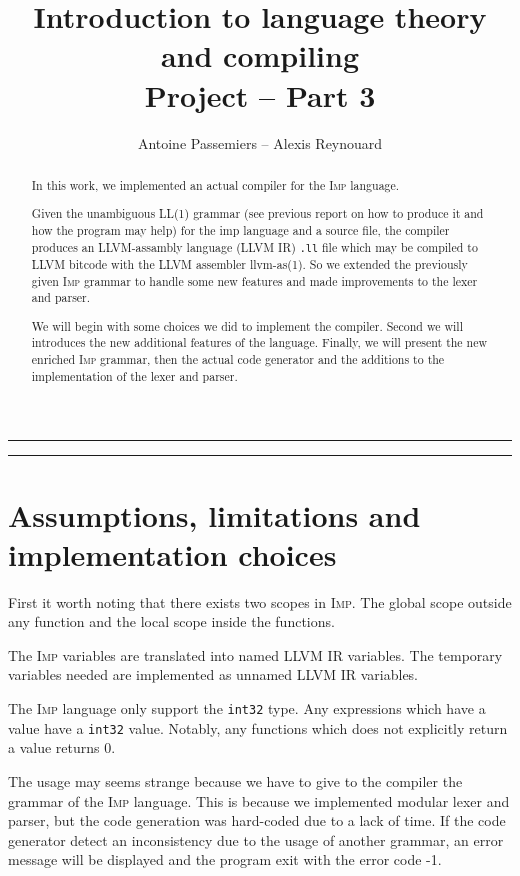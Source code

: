 \documentclass[11pt]{article}
\title{Introduction to language theory and compiling \\ Project -- Part 3}
\author{Antoine Passemiers -- Alexis Reynouard}
\newcommand\imp{\textsc{Imp}\xspace}
\newcommand\inttt{\texttt{int32}\xspace}
\begin{document}
\maketitle
\thispagestyle{empty}

\vfil
\begin{abstract}
In this work, we implemented an actual compiler for the \imp language.

Given the unambiguous LL(1) grammar (see previous report on how to produce it and how the program may help) for the imp
language and a source file, the compiler produces an LLVM-assambly language (LLVM IR) \texttt{.ll} file which may be
compiled to LLVM bitcode with the LLVM assembler \textsf{llvm-as(1)}.
So we extended the previously given \imp grammar to handle some new features
and made improvements to the lexer and parser.

We will begin with some choices we did to implement the compiler.
Second we will introduces the new additional features of the language.
Finally, we will present the new enriched \imp grammar,
then the actual code generator and the additions to the implementation of the lexer and parser.
\end{abstract}

\clearpage
\vfill
\hrule
\vspace{\baselineskip}
\tableofcontents
\vspace{3\baselineskip}
\hrule
\vfill
\clearpage

\setcounter{page}{1}

\section{Assumptions, limitations and implementation choices}

First it worth noting that there exists two scopes in \imp.
The global scope outside any function and the local scope inside the functions.

The \imp variables are translated into named LLVM IR variables.
The temporary variables needed are implemented as unnamed LLVM IR variables.

The \imp language only support the \inttt type.
Any expressions which have a value have a \inttt value.
Notably, any functions which does not explicitly return a value returns 0.

The usage may seems strange because we have to give to the compiler the grammar of the \imp language.
This is because we implemented modular lexer and parser, but the code generation was hard-coded due to a lack of time.
If the code generator detect an inconsistency due to the usage of another grammar, an error message will be displayed
and the program exit with the error code -1.
\end{document}
